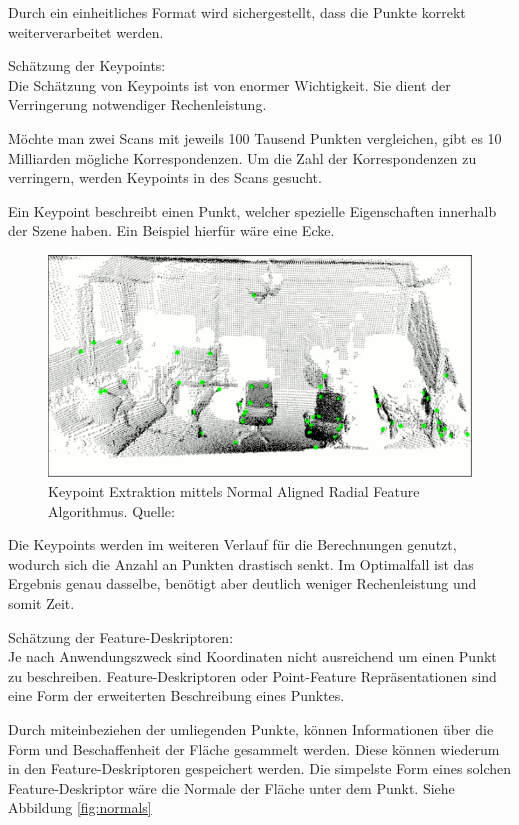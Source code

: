 Durch ein einheitliches Format wird sichergestellt, dass die Punkte korrekt weiterverarbeitet werden.
\newline

Schätzung der Keypoints: \\
Die Schätzung von Keypoints ist von enormer Wichtigkeit.
Sie dient der Verringerung notwendiger Rechenleistung.

Möchte man zwei Scans mit jeweils 100 Tausend Punkten vergleichen, gibt es 10 Milliarden mögliche Korrespondenzen.
Um die Zahl der Korrespondenzen zu verringern, werden Keypoints in des Scans gesucht.

Ein Keypoint beschreibt einen Punkt, welcher spezielle Eigenschaften innerhalb der Szene haben.
Ein Beispiel hierfür wäre eine Ecke.

\begin{figure}[H]
    \centering
    \includegraphics[width=12cm]{graphics/keypoint.png}
    \caption{Keypoint Extraktion mittels Normal Aligned Radial Feature Algorithmus. Quelle: \cite{keypoints2023}}
    \label{fig:keypoints}
\end{figure}

Die Keypoints werden im weiteren Verlauf für die Berechnungen genutzt, wodurch sich die Anzahl an Punkten drastisch senkt.
Im Optimalfall ist das Ergebnis genau dasselbe, benötigt aber deutlich weniger Rechenleistung und somit Zeit.
\newline

Schätzung der Feature-Deskriptoren: \\
Je nach Anwendungszweck sind Koordinaten nicht ausreichend um einen Punkt zu beschreiben.
Feature-Deskriptoren oder Point-Feature Repräsentationen sind eine Form der erweiterten Beschreibung eines Punktes.

Durch miteinbeziehen der umliegenden Punkte, können Informationen über die Form und Beschaffenheit der Fläche gesammelt werden.
Diese können wiederum in den Feature-Deskriptoren gespeichert werden.
Die simpelste Form eines solchen Feature-Deskriptor wäre die Normale der Fläche unter dem Punkt. Siehe Abbildung \ref{fig:normals}

